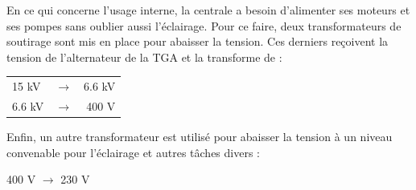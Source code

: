 En ce qui concerne l'usage interne, la centrale a besoin d'alimenter ses moteurs et ses pompes sans oublier aussi l'éclairage. Pour ce faire, deux transformateurs de soutirage sont mis en place pour abaisser la tension. Ces derniers reçoivent la tension de l'alternateur de la TGA et la transforme de : \begin{center}
\begin{tabular}{l c r}
15 kV & $\longrightarrow $& 6.6 kV\\
6.6 kV &$\longrightarrow $& 400 V\\
\end{tabular}
\end{center}
Enfin, un autre transformateur est utilisé pour abaisser la tension à un niveau convenable pour l'éclairage et autres tâches divers :
\begin{center}
400 V  $\longrightarrow $ 230 V\\
\end{center}

